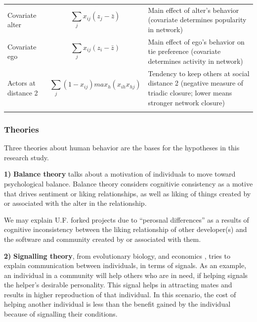 \documentclass{acm_proc_article-sp}
\begin{document}
\begin{table}[!ht]
\begin{tabular}{m{} m{} m{}}
Covariate alter & \begin{equation*} \sum_j x_{ij} (z_j - \bar z) \end{equation*} & Main effect of alter's behavior (covariate determines popularity in network) \\ 
Covariate ego & \begin{equation*} \sum_j x_{ij} (z_i - \bar z) \end{equation*} & Main effect of ego's behavior on tie preference (covariate determines activity in network) \\
Actors at distance 2 & \begin{equation*} \sum_j (1 - x_{ij}) max_h (x_{ih}x_{hj}) \end{equation*} & Tendency to keep others at social distance 2 (negative measure of triadic closure; lower means stronger network closure) \\ 
\noalign{\smallskip}\hline
\end{tabular}
\end{table}

\subsubsection{Theories}
Three theories about human behavior are the bases for the hypotheses in this research study.

\textbf{1)} \textbf{Balance theory} \cite{Heider} talks about a motivation of individuals to move toward psychological balance. Balance theory considers cognitivie consistency as a motive that drives sentiment or liking relationships, as well as liking of things created by or associated with the alter in the relationship.

We may explain U.F. forked projects due to ``perosnal differences'' as a results of cognitive inconsistency between the liking relationship of other developer(s) and the software and community created by or associated with them. 

\textbf{2)} \textbf{Signalling theory}, from evolutionary biology, and economics \cite{Spence}, tries to explain communication between individuals, in terms of signals. As an example, an individual in a community will help others who are in need, if helping signals the helper's desirable personality. This signal helps in attracting mates and results in higher reproduction of that individual. In this scenario, the cost of helping another individual is less than the benefit gained by the individual because of signalling their conditions. 
\end{document}
